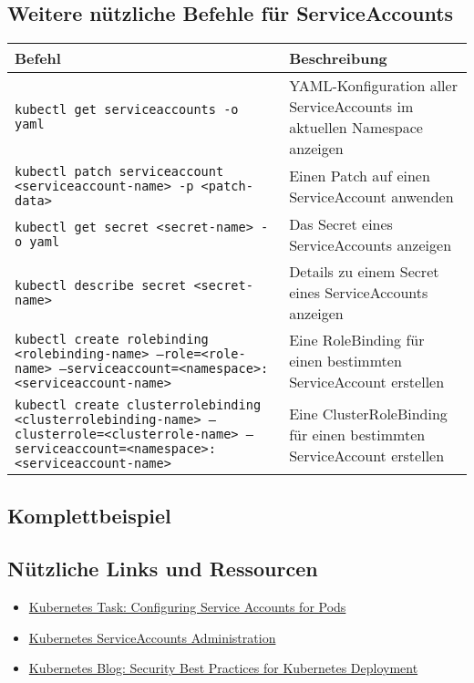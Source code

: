 \subsection{Weitere nützliche Befehle für ServiceAccounts}
\begin{tabular}{|p{}|p{}|}
\hline
\textbf{Befehl} & \textbf{Beschreibung} \\
\hline
\texttt{kubectl get serviceaccounts -o yaml} & YAML-Konfiguration aller ServiceAccounts im aktuellen Namespace anzeigen \\
\texttt{kubectl patch serviceaccount <serviceaccount-name> -p <patch-data>} & Einen Patch auf einen ServiceAccount anwenden \\
\texttt{kubectl get secret <secret-name> -o yaml} & Das Secret eines ServiceAccounts anzeigen \\
\texttt{kubectl describe secret <secret-name>} & Details zu einem Secret eines ServiceAccounts anzeigen \\
\texttt{kubectl create rolebinding <rolebinding-name> --role=<role-name> --serviceaccount=<namespace>:<serviceaccount-name>} & Eine RoleBinding für einen bestimmten ServiceAccount erstellen \\
\texttt{kubectl create clusterrolebinding <clusterrolebinding-name> --clusterrole=<clusterrole-name> --serviceaccount=<namespace>:<serviceaccount-name>} & Eine ClusterRoleBinding für einen bestimmten ServiceAccount erstellen \\
\hline
\end{tabular}
\newpage
\subsection{Komplettbeispiel}

\subsection*{Nützliche Links und Ressourcen}
\begin{itemize}
    \item \href{https://kubernetes.io/docs/tasks/configure-pod-container/configure-service-account/}{Kubernetes Task: Configuring Service Accounts for Pods}
    \item \href{https://kubernetes.io/docs/reference/access-authn-authz/service-accounts-admin/}{Kubernetes ServiceAccounts Administration}
    \item \href{https://kubernetes.io/blog/2016/08/security-best-practices-kubernetes-deployment/}{Kubernetes Blog: Security Best Practices for Kubernetes Deployment}
\end{itemize}


